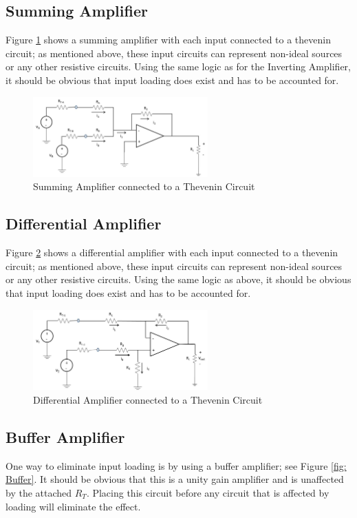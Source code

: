 \documentclass{handout}
\begin{document}
\subsection{Summing Amplifier}
Figure \ref{fig: SummingAmplifier} shows a summing amplifier with each input connected to a thevenin circuit; as mentioned above, these input circuits can represent  non-ideal sources or any other resistive circuits.  Using the same logic as for the Inverting Amplifier, it should be obvious that input loading does exist and has to be accounted for.

\begin{figure} [h!]
\centering
\includegraphics[width=0.6\textwidth]{SummingAmplifier.jpg}
\caption{Summing Amplifier connected to a Thevenin Circuit}
\label{fig: SummingAmplifier}
\end{figure}

\subsection{Differential Amplifier}
Figure \ref{fig: DifferentialAmplifier} shows a differential amplifier with each input connected to a thevenin circuit; as mentioned above, these input circuits can represent  non-ideal sources or any other resistive circuits.  Using the same logic as above, it should be obvious that input loading does exist and has to be accounted for.

\begin{figure} [h!]
\centering
\includegraphics[width=0.6\textwidth]{DifferentialAmplifier.jpg}
\caption{Differential Amplifier connected to a Thevenin Circuit}
\label{fig: DifferentialAmplifier}
\end{figure}

\subsection{Buffer Amplifier}
One way to eliminate input loading is by using a buffer amplifier; see Figure \ref{fig: Buffer}.  It should be obvious that this is a unity gain amplifier and is unaffected by the attached $R_T$.  Placing this circuit before any circuit that is affected by loading will eliminate the effect.
\end{document}
